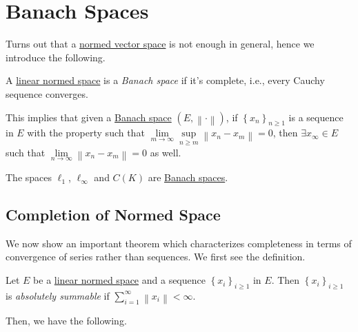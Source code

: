 \section{Banach Spaces}
Turns out that a \hyperref[def:normed-vector-space]{normed vector space} is not enough in general, hence we introduce the following.

\begin{definition}\label{def:Banach-space}
	A \hyperref[def:normed-vector-space]{linear normed space} is a \emph{Banach space} if it's complete, i.e., every Cauchy sequence converges.
\end{definition}

This implies that given a \hyperref[def:Banach-space]{Banach space} \((E, \left\lVert \cdot\right\rVert )\), if \(\left\{ x_n \right\}_{n \geq 1}\) is a sequence in \(E\) with the property such that \(\lim\limits_{m \to \infty} \sup\limits_{n\geq m} \left\lVert x_n - x_m\right\rVert = 0 \), then \(\exists x_{\infty }\in E\) such that \(\lim\limits_{n \to \infty} \left\lVert x_n - x_m\right\rVert = 0\) as well.

\begin{eg}
	The spaces \(\ell _1\), \(\ell _{\infty }\) and \(C(K)\) are \hyperref[def:Banach-space]{Banach spaces}.
\end{eg}

\subsection{Completion of Normed Space}
We now show an important theorem which characterizes completeness in terms of convergence of series rather than sequences. We first see the definition.

\begin{definition}\label{def:absolutely-summable}
	Let \(E\) be a \hyperref[def:normed-vector-space]{linear normed space} and a sequence \(\left\{ x_{i} \right\}_{i \geq 1}\) in \(E\). Then \(\left\{ x_i \right\}_{i \geq 1} \) is \emph{absolutely summable} if \(\sum_{i=1}^{\infty} \left\lVert x_i\right\rVert < \infty \).
\end{definition}

Then, we have the following.

